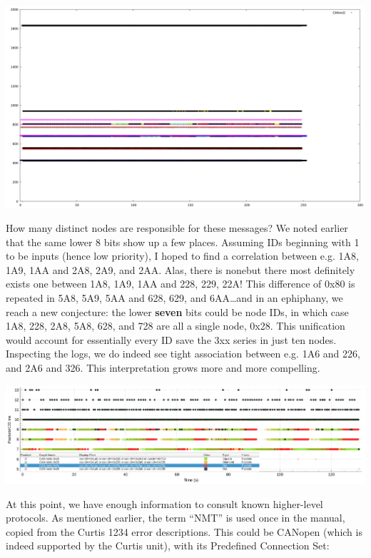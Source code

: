 \documentclass[letterpaper,10pt]{article}
\begin{document}
\begin{center}
\includegraphics[width=.5\linewidth]{cantime.png}
\end{center}

How many distinct nodes are responsible for these messages? We noted earlier
that the same lower 8 bits show up a few places. Assuming IDs
beginning with 1 to be inputs (hence low priority), I hoped to find a
correlation between e.g. 1A8, 1A9, 1AA and 2A8, 2A9, and 2AA. Alas, there is
none{\textemdash}but there most definitely exists one between 1A8, 1A9, 1AA and
228, 229, 22A! This difference of 0x80 is repeated in 5A8, 5A9, 5AA and 628,
629, and 6AA\ldots and in an ephiphany, we reach a new conjecture: the lower
\textbf{seven} bits could be node IDs, in which case 1A8, 228, 2A8, 5A8, 628,
and 728 are all a single node, 0x28. This unification would account for
essentially every ID save the 3xx series in just ten nodes. Inspecting the logs,
we do indeed see tight association between e.g. 1A6 and 226, and 2A6 and 326.
This interpretation grows more and more compelling.

\begin{center}
\includegraphics[width=1\linewidth]{wireshark.png}
\end{center}

At this point, we have enough information to consult known higher-level
protocols. As mentioned earlier, the term ``NMT'' is used once in the manual,
copied from the Curtis 1234 error descriptions. This could be CANopen (which
is indeed supported by the Curtis unit), with its Predefined Connection Set:
\end{document}

